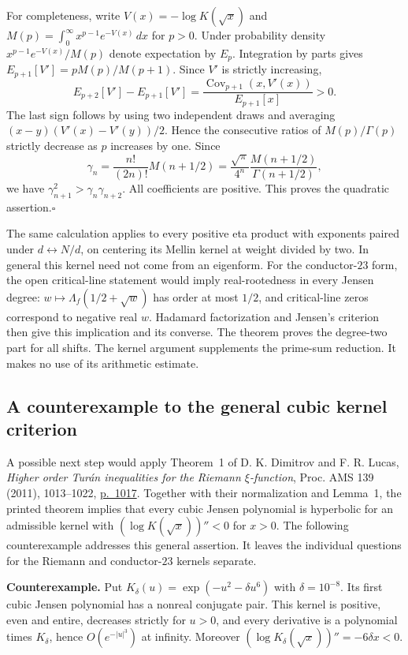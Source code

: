 For completeness, write $V(x)=-\log K(\sqrt{x})$ and
$M(p)=\int_0^\infty x^{p-1}e^{-V(x)}\,dx$ for $p>0$. Under probability
density $x^{p-1}e^{-V(x)}/M(p)$ denote expectation by $E_p$.
Integration by parts gives
$E_{p+1}[V']=p M(p)/M(p+1)$. Since $V'$ is strictly increasing,
\[
 E_{p+2}[V']-E_{p+1}[V']
 =\frac{\operatorname{Cov}_{p+1}(x,V'(x))}{E_{p+1}[x]}>0.
\]
The last sign follows by using two independent draws and averaging
$(x-y)(V'(x)-V'(y))/2$. Hence the consecutive ratios of $M(p)/\Gamma(p)$
strictly decrease as $p$ increases by one. Since
\[
 \gamma_n=\frac{n!}{(2n)!}M(n+1/2)
 =\frac{\sqrt\pi}{4^n}\frac{M(n+1/2)}{\Gamma(n+1/2)},
\]
we have $\gamma_{n+1}^2>\gamma_n\gamma_{n+2}$. All coefficients are
positive. This proves the quadratic assertion.\hfill$\square$

The same calculation applies to every positive eta product with
exponents paired under $d\leftrightarrow N/d$, on centering its
Mellin kernel at weight divided by two. In general this kernel need not
come from an eigenform. For the conductor-$23$ form, the open critical-line
statement would imply real-rootedness in every Jensen degree:
$w\mapsto\Lambda_f(1/2+\sqrt w)$ has order at most $1/2$, and critical-line
zeros correspond to negative real $w$. Hadamard factorization and Jensen's
criterion then give this implication and its converse. The theorem proves
the degree-two part for all shifts. The kernel argument supplements the
prime-sum reduction. It makes no use of its arithmetic estimate.

\subsection{A counterexample to the general cubic kernel criterion}
A possible next step would apply Theorem~1 of D. K. Dimitrov and
F. R. Lucas, \emph{Higher order Tur\'an inequalities for the Riemann
$\xi$-function}, Proc. AMS 139 (2011), 1013--1022,
\href{https://doi.org/10.1090/S0002-9939-2010-10515-4}{p.~1017}.
Together with their normalization and Lemma~1, the printed theorem implies
that every cubic Jensen polynomial is hyperbolic for an admissible
kernel with $(\log K(\sqrt{x}))''<0$ for $x>0$. The following counterexample
addresses this general assertion. It leaves the individual questions for
the Riemann and conductor-$23$ kernels separate.

\textbf{Counterexample.} Put $K_\delta(u)=\exp(-u^2-\delta u^6)$ with
$\delta=10^{-8}$. Its first cubic Jensen polynomial has a nonreal
conjugate pair. This kernel is positive, even and entire, decreases
strictly for $u>0$, and every derivative is a polynomial times $K_\delta$,
hence $O(e^{-|u|^3})$ at infinity. Moreover
$(\log K_\delta(\sqrt{x}))''=-6\delta x<0$.

